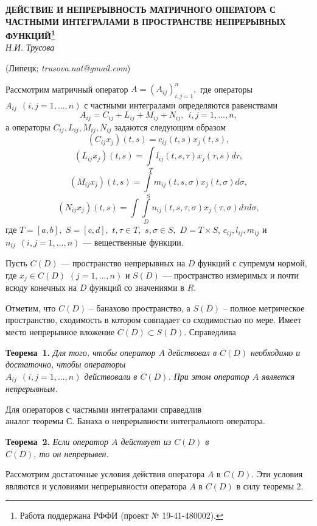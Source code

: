 \begin{center}
    {\bf ДЕЙСТВИЕ И НЕПРЕРЫВНОСТЬ МАТРИЧНОГО ОПЕРАТОРА С ЧАСТНЫМИ ИНТЕГРАЛАМИ В ПРОСТРАНСТВЕ НЕПРЕРЫВНЫХ ФУНКЦИЙ\footnote{Работа поддержана РФФИ (проект № 19-41-480002).}}\\

    {\it Н.И. Трусова}

    (Липецк; {\it trusova.nat@gmail.com})
\end{center}


Рассмотрим матричный оператор $A= (A_{ij})_{i,j=1}^n,$
где операторы $A_{ij} \ \ (i,j=1,...,n)$ с частными интегралами определяются равенствами
$$
A_{ij}=C_{ij}+L_{ij}+M_{ij}+N_{ij}, \ \ i,j=1,...,n,
$$
а операторы $C_{ij},L_{ij},M_{ij},N_{ij}$ задаются следующим образом
$$
(C_{ij}x_j)(t,s)=c_{ij}(t,s)x_j(t,s),
$$
$$
(L_{ij}x_j)(t,s)=\int\limits_T l_{ij}(t,s,\tau)x_j(\tau,s)d\tau,
$$
$$
(M_{ij}x_j)(t,s)=\int\limits_S m_{ij}(t,s,\sigma)x_j(t,\sigma)d\sigma,
$$
$$
(N_{ij}x_j)(t,s)=\int\int\limits_D n_{ij}(t,s,\tau,\sigma)x_j(\tau,\sigma)d\tau d\sigma,
$$
где $T=[a,b],$ $S=[c,d],$ $t,\tau\in T,$ $s,\sigma\in S,$ $D=T\times S $, $c_{ij}, l_{ij}, m_{ij}$ и $n_{ij} \ \ (i,j=1,...,n)$ --- вещественные функции.

Пусть $C(D)$ --- пространство непрерывных на $D$ функций с супремум нормой, где $x_j\in C(D)$ $(j=1,\dots,n)$ и $S(D)$ --- пространство измеримых и почти всюду конечных на $D$ функций со значениями в $R$.

Отметим, что $C(D)$ -- банахово пространство, а $S(D)$ -- полное
метрическое пространство, сходимость в котором совпадает со
сходимостью по мере. Имеет место непрерывное вложение
$C(D)\subset S(D)$. Справедлива

\textbf{Теорема~1.} {\it Для того, чтобы оператор $A$ действовал в $C(D)$ необходимо и достаточно, чтобы операторы
\\$A_{ij} \ \ (i,j=1,...,n)$ действовали в $C(D)$. При этом оператор $A$ является непрерывным.}

Для операторов с частными интегралами справедлив
\\аналог теоремы С. Банаха о непрерывности интегрального оператора.

\textbf{Теорема~2.} {\it Если оператор $A$ действует из $C(D)$ в
\\$C(D)$, то он непрерывен.}

Рассмотрим достаточные условия действия оператора $A$ в
$C(D)$. Эти условия являются и условиями непрерывности оператора
$A$ в $C(D)$ в силу теоремы 2.

